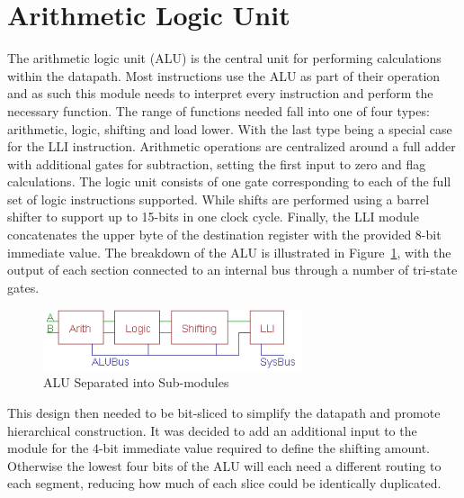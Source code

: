 

\section{Arithmetic Logic Unit}\label{sect:design:alu}

The arithmetic logic unit (ALU) is the central unit for performing calculations within the datapath. 
Most instructions use the ALU as part of their operation and as such this module needs to interpret every instruction and perform the necessary function. 
The range of functions needed fall into one of four types: arithmetic, logic, shifting and load lower. 
With the last type being a special case for the LLI instruction. 
Arithmetic operations are centralized around a full adder with additional gates for subtraction, setting the first input to zero and flag calculations. 
The logic unit consists of one gate corresponding to each of the full set of logic instructions supported. 
While shifts are performed using a barrel shifter to support up to 15-bits in one clock cycle. 
Finally, the LLI module concatenates the upper byte of the destination register with the provided 8-bit immediate value. 
The breakdown of the ALU is illustrated in Figure~\ref{fig:abstractALU}, with the output of each section connected to an internal bus through a number of tri-state gates. 


\begin{figure}[h]
	\centering
	\includegraphics[width=3in]{Figures/AbstractALU.png}
	\caption{ALU Separated into Sub-modules}
	\label{fig:abstractALU}
\end{figure}

This design then needed to be bit-sliced to simplify the datapath and promote hierarchical construction. 
It was decided to add an additional input to the module for the 4-bit immediate value required to define the shifting amount. 
Otherwise the lowest four bits of the ALU will each need a different routing to each segment, reducing how much of each slice could be identically duplicated. 

